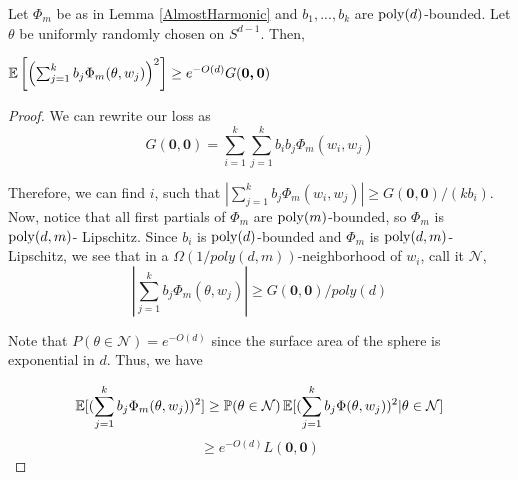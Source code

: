  

\begin{lemma}\label{bigVariance}
Let $\Phi_m$ be as in Lemma \ref{AlmostHarmonic} and $b_1,...,b_k$ are $\mathrm{poly}(d)$-bounded. Let $\theta$ be uniformly randomly chosen on $S^{d-1}$. Then,
 
 $\operatorname*{\mathbb{E}}\left[\left(  \sum_{j=1}^k b_j \Phi_m(\theta,w_j)\right)^2\right]
 \geq e^{-O(d)}G(\boldsymbol{0,0})$
\end{lemma}
\begin{proof}

We can rewrite our loss as
%
\[G(\boldsymbol{0,0}) =  \sum_{i=1}^k\sum_{j=1}^k b_i b_j \Phi_m(w_i, w_j) \]

Therefore, we can find $i$, such that
$|\sum_{j=1}^k b_j \Phi_m(w_i, w_j)| \geq
G(\boldsymbol{0,0})/(kb_i)$. Now, notice that all first partials of $\Phi_m$ are $\mathrm{poly}(m)$-bounded, so $\Phi_m$ is $\mathrm{poly}(d, m)$- Lipschitz. Since $b_i$ is $\mathrm{poly}(d)$-bounded and $\Phi_m$ is $\mathrm{poly}(d,m)$-Lipschitz, we see
that in a $\Omega(1/poly(d,m))$-neighborhood of $w_i$, call it $\mathcal{N}$,
%
\[|\sum_{j=1}^k b_j \Phi_m(\theta, w_j)| \geq G(\boldsymbol{0,0})/poly(d) \]

Note that $P(\theta \in \mathcal{N}) = e^{-O(d)}$ since the surface area of the sphere is exponential in $d$. Thus, we have

\[\operatorname*{\mathbb{E}}[(  \sum_{j=1}^k b_j \Phi_m(\theta,w_j))^2]
 \geq \operatorname*{\mathbb{P}}(\theta \in \mathcal{N})\operatorname*{\mathbb{E}}[(\sum_{j=1}^k b_j \Phi(\theta, w_j))^2 | \theta \in \mathcal{N}]\]
\[\geq e^{-O(d)} L(\boldsymbol{0,0})\]
\end{proof}




